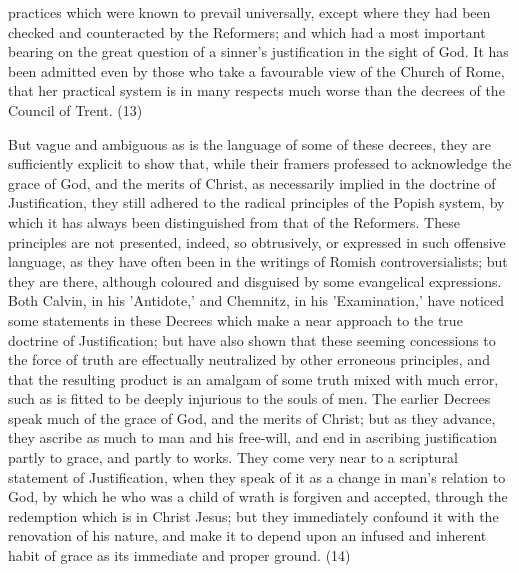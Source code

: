 \documentclass[
]{book}
\begin{document}
practices which were known to prevail universally, except where they had been checked and counteracted by the Reformers; and which had a most important bearing on the great question of a sinner's justification in the sight of God. It has been admitted even by those who take a favourable view of the Church of Rome, that her practical system is in many respects much worse than the decrees of the Council of Trent. (13)

But vague and ambiguous as is the language of some of these decrees, they are sufficiently explicit to show that, while their framers professed to acknowledge the grace of God, and the merits of Christ, as necessarily implied in the doctrine of Justification, they still adhered to the radical principles of the Popish system, by which it has always been distinguished from that of the Reformers. These principles are not presented, indeed, so obtrusively, or expressed in such offensive language, as they have often been in the writings of Romish controversialists; but they are there, although coloured and disguised by some evangelical expressions. Both Calvin, in his 'Antidote,' and Chemnitz, in his 'Examination,' have noticed some statements in these Decrees which make a near approach to the true doctrine of Justification; but have also shown that these seeming concessions to the force of truth are effectually neutralized by other erroneous principles, and that the resulting product is an amalgam of some truth mixed with much error, such as is fitted to be deeply injurious to the souls of men. The earlier Decrees speak much of the grace of God, and the merits of Christ; but as they advance, they ascribe as much to man and his free-will, and end in ascribing justification partly to grace, and partly to works. They come very near to a scriptural statement of Justification, when they speak of it as a change in man's relation to God, by which he who was a child of wrath is forgiven and accepted, through the redemption which is in Christ Jesus; but they immediately confound it with the renovation of his nature, and make it to depend upon an infused and inherent habit of grace as its immediate and proper ground. (14)
\end{document}
